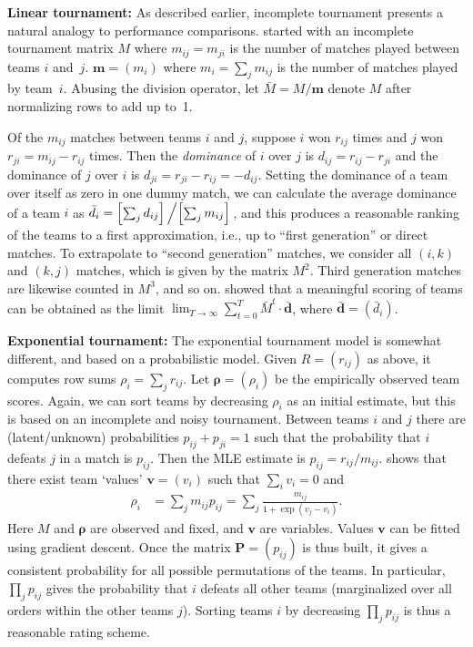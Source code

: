 \documentclass[runningheads]{llncs}
\begin{document}
\noindent \textbf{Linear tournament:}
As described earlier, incomplete tournament presents a natural analogy to performance comparisons. \cite{Redmond2003Tournament} started with an incomplete tournament matrix $M$ where $m_{ij} = m_{ji}$ is the number of matches played between teams $i$ and~$j$.  
$\pmb{m}=(m_i)$ where $m_i = \sum_j m_{ij}$ is the number of matches played by team~$i$.  Abusing the division operator, let $\bar{M} = M/\pmb{m}$ denote $M$ after normalizing rows to add up to~1.

Of the $m_{ij}$ matches between teams $i$ and $j$, suppose $i$ won $r_{ij}$ times and $j$ won $r_{ji} = m_{ij} - r_{ij}$ times.  Then the \emph{dominance} of $i$ over $j$ is $d_{ij} = r_{ij} - r_{ji}$ and the dominance of $j$ over $i$ is $d_{ji} = r_{ji}-r_{ij} = -d_{ij}$.  Setting the dominance of a team over itself as zero in one dummy match, we can calculate the average dominance of a team $i$ as $\bar{d}_i = \left[\sum_j d_{ij}\right]\left/\left[\sum_{j} m_{ij}\right]\right.$, and this produces a reasonable ranking of the teams to a first approximation, i.e., up to ``first generation'' or direct matches.  To extrapolate to ``second generation'' matches, we consider all $(i,k)$ and $(k,j)$ matches, which is given by the matrix $M^2$.  Third generation matches are likewise counted in $M^3$, and so on.  \cite{David1987Tournament} showed that a meaningful scoring of teams can be obtained as the limit $\lim_{T\to\infty}\sum_{t=0}^T \bar{M}^t \cdot \bar{\pmb{d}}$, where $\bar{\pmb{d}}=(\bar{d}_i)$.


\noindent \textbf{Exponential tournament:}
The exponential tournament model \cite{Jech1983Tournament} is somewhat different, and based on a probabilistic model.  Given $R = (r_{ij})$ as above, it computes row sums $\rho_i = \sum_j r_{ij}$.  Let $\pmb{\rho} = (\rho_i)$ be the empirically observed team scores.  Again, we can sort teams by decreasing $\rho_i$ as an initial estimate, but this is based on an incomplete and noisy tournament.  Between teams $i$ and $j$ there are (latent/unknown) probabilities $p_{ij} + p_{ji} = 1$ such that the probability that $i$ defeats $j$ in a match is $p_{ij}$.  Then the MLE estimate is $p_{ij} = r_{ij}/m_{ij}$.  \cite{Jech1983Tournament} shows that there exist team `values' $\pmb{v} = (v_i)$ such that $\sum_i v_i = 0$ and
\begin{align}
\rho_i &= \sum_j m_{ij} p_{ij} = \sum_j \frac{m_{ij}}{1 + \exp(v_j - v_i)}.
\end{align}
Here $M$ and $\pmb{\rho}$ are observed and fixed, and $\pmb{v}$ are variables.
Values $\pmb{v}$ can be fitted using gradient descent.  Once the matrix $\pmb{P}=(p_{ij})$ is thus built, it gives a consistent probability for all possible permutations of the teams.  In particular, $\prod_j p_{ij}$ gives the probability that $i$ defeats all other teams (marginalized over all orders within the other teams $j$).  Sorting teams $i$ by decreasing $\prod_j p_{ij}$ is thus a reasonable rating scheme.
\end{document}
